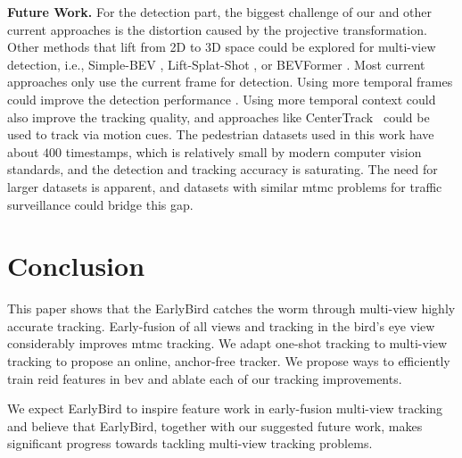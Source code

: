 \documentclass[10pt,twocolumn,letterpaper]{article}
\newcommand{\nparagraph}[1]{\noindent\textbf{#1.  }}
\def\sname{EarlyBird\xspace}
\begin{document}
\nparagraph{Future Work}
For the detection part, the biggest challenge of our and other current approaches \cite{hou2021multiview, lee2023multi, song2021stacked} is the distortion caused by the projective transformation. Other methods that lift from 2D to 3D space could be explored for multi-view detection, i.e., Simple-BEV \cite{harley2022simple}, Lift-Splat-Shot \cite{philion2020lift}, or BEVFormer \cite{li2022bevformer}.
Most current approaches only use the current frame for detection. Using more temporal frames could improve the detection performance \cite{li2022bevformer}. Using more temporal context could also improve the tracking quality, and approaches like CenterTrack~\cite{zhou2020tracking} could be used to track via motion cues.
The pedestrian datasets used in this work have about $400$ timestamps, which is relatively small by modern computer vision standards, and the detection and tracking accuracy is saturating. The need for larger datasets is apparent, and datasets with similar \gls{mtmc} problems for traffic surveillance \cite{tang2019cityflow, synthehicle2023herzog} could bridge this gap. 

\section{Conclusion}\label{sec:conclusion}
This paper shows that the \sname catches the worm through multi-view highly accurate tracking. Early-fusion of all views and tracking in the bird's eye view considerably improves \gls{mtmc} tracking. We adapt one-shot tracking to multi-view tracking to propose an online, anchor-free tracker. We propose ways to efficiently train \gls{reid} features in \gls{bev} and ablate each of our tracking improvements.

We expect \sname to inspire feature work in early-fusion multi-view tracking and believe that \sname, together with our suggested future work, makes significant progress towards tackling multi-view tracking problems.
 

{\small


}
\end{document}
